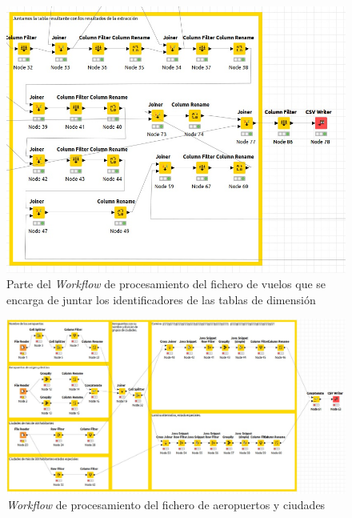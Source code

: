 \documentclass{article}
\begin{document}
\begin{landscape}
\begin{figure}
        \includegraphics[scale=0.5]{images/workflow_vuelos_joins.jpeg}
        \caption{Parte del \textit{Workflow} de procesamiento del fichero de vuelos que se encarga de juntar los identificadores de las tablas de dimensión}
        \label{fig:workflow_vuelos_join}
    \end{figure}
    \newpage
    \begin{figure}
        \centering
        \includegraphics[scale=0.5]{images/workflow_ciudades.jpeg}
        \caption{\textit{Workflow} de procesamiento del fichero de aeropuertos y ciudades}
        \label{fig:workflow_aeropuertos_ciudades}
    \end{figure}
    \newpage
    \begin{figure}
        \centering

\end{figure}
\end{landscape}
\end{document}
